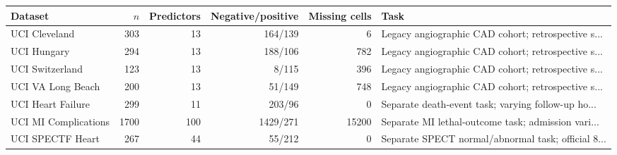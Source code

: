 \begin{tabular}{lrrrrl}
\toprule
Dataset & $n$ & Predictors & Negative/positive & Missing cells & Task \\
\midrule
UCI Cleveland & 303 & 13 & 164/139 & 6 & Legacy angiographic CAD cohort; retrospective s... \\
UCI Hungary & 294 & 13 & 188/106 & 782 & Legacy angiographic CAD cohort; retrospective s... \\
UCI Switzerland & 123 & 13 & 8/115 & 396 & Legacy angiographic CAD cohort; retrospective s... \\
UCI VA Long Beach & 200 & 13 & 51/149 & 748 & Legacy angiographic CAD cohort; retrospective s... \\
UCI Heart Failure & 299 & 11 & 203/96 & 0 & Separate death-event task; varying follow-up ho... \\
UCI MI Complications & 1700 & 100 & 1429/271 & 15200 & Separate MI lethal-outcome task; admission vari... \\
UCI SPECTF Heart & 267 & 44 & 55/212 & 0 & Separate SPECT normal/abnormal task; official 8... \\
\bottomrule
\end{tabular}
